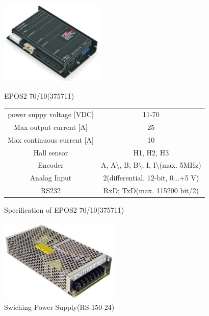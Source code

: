 \documentclass[a4paper,12pt]{article_vdlab_sotsuron}
\begin{document}
\vspace*{20mm}
\begin{figure}[htp]
  \begin{minipage}{0.4\textwidth}
    \begin{center}
      \includegraphics[height=40mm]{figure/epos.eps}
      \vspace*{3mm}
      \caption{EPOS2 70/10(375711)}
    \label{fig:epos}
    \end{center}
  \end{minipage}
  \begin{minipage}{0.6\textwidth}
      \begin{center}
	\makeatletter
	\def\@captype{table}
	\makeatother
	\caption{Specification of EPOS2 70/10(375711)}
	\label{tab:epos}
	\begin{tabular}{cc}\hline
	  power suppy voltage [VDC] & 11-70\\
	  Max output current [A] & 25\\
	  Max continuous current [A] & 10\\
	  Hall sensor & H1, H2, H3 \\
	  Encoder & A, A$\setminus$, B, B$\setminus$, I, I$\setminus$(max. 5MHz)\\
	  Analog Input & 2(differential, 12-bit, 0...+5 V)\\
	  RS232 & RxD; TxD(max. 115200 bit/2) \\\hline
	  \end{tabular}
	\end{center}
  \end{minipage}
\end{figure}

\vspace*{20mm}
\begin{figure}[htp]
  \begin{center}
    \includegraphics[height=40mm]{figure/rs_150_24.eps}
    \vspace*{3mm}
    \caption{Swiching Power Supply(RS-150-24)}
    \label{fig:rs_150_24}
  \end{center}
\end{figure}
\end{document}
